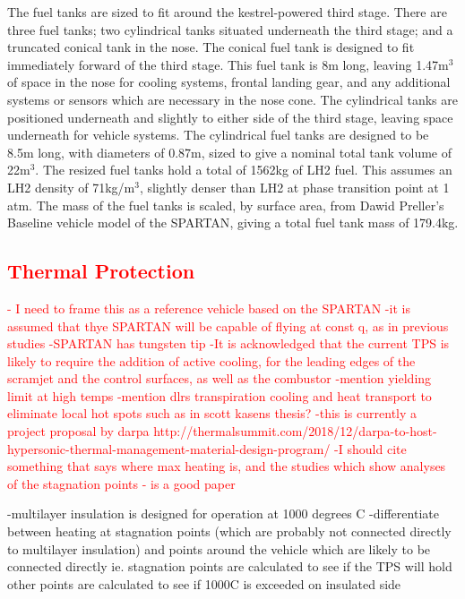 		

		The fuel tanks are sized to fit around the kestrel-powered third stage. There are three fuel tanks; two cylindrical tanks situated underneath the third stage; and a truncated conical tank in the nose. The conical fuel tank is designed to fit immediately forward of the third stage. This fuel tank is 8m long, leaving 1.47m$^3$ of space in the nose for cooling systems, frontal landing gear, and any additional systems or sensors which are necessary in the nose cone. The cylindrical tanks are positioned underneath and slightly to either side of the third stage, leaving space underneath for vehicle systems. The cylindrical fuel tanks are designed to be 8.5m long, with diameters of 0.87m, sized to give a nominal total tank volume of 22m$^3$.
The resized fuel tanks hold a total of 1562kg of LH2 fuel. This assumes an LH2 density of 71kg/m$^3$, slightly denser than LH2 at phase transition point at 1 atm.
The mass of the fuel tanks is scaled, by surface area, from Dawid Preller's Baseline vehicle model of the SPARTAN\cite{Preller2017b}, giving a total fuel tank mass of 179.4kg.
		
		\textcolor{red}{\subsection{Thermal Protection}
			- I need to frame this as a reference vehicle based on the SPARTAN
			-it is assumed that thye SPARTAN will be capable of flying at const q, as in previous studies
			-SPARTAN has tungsten tip
			-It is acknowledged that the current TPS is likely to require the addition of active cooling, for the leading edges of the scramjet and the control surfaces, as well as the combustor
			-mention yielding limit at high temps
			-mention dlrs transpiration cooling and heat transport to eliminate local hot spots such as in scott kasens thesis?
			-this is currently a project proposal by darpa http://thermalsummit.com/2018/12/darpa-to-host-hypersonic-thermal-management-material-design-program/
			-I should cite something that says where max heating is, and the studies which show analyses of the stagnation points
			-\cite{Marley2017} is a good paper
		}
		-multilayer insulation is designed for operation at 1000 degrees C
		-differentiate between heating at stagnation points (which are probably not connected directly to multilayer insulation) and points around the vehicle which are likely to be connected directly
		ie. stagnation points are calculated to see if the TPS will hold other points are calculated to see if 1000C is exceeded on insulated side 


